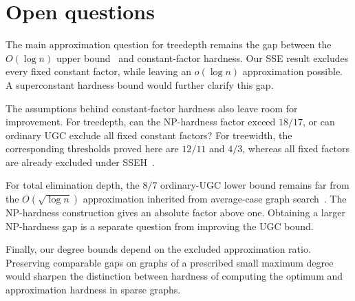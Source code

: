 \section{Open questions}
\label{sec:conclusion}

The main approximation question for treedepth remains the gap
between the $O(\log n)$ upper bound~\cite{Anand2026} and
constant-factor hardness. Our \textup{SSE} result excludes every fixed
constant factor, while leaving an $o(\log n)$ approximation
possible. A superconstant hardness bound would further clarify
this gap.

The assumptions behind constant-factor hardness also leave room
for improvement. For treedepth, can the \textup{NP}-hardness factor exceed
$18/17$, or can ordinary \textup{UGC} exclude all fixed constant factors?
For treewidth, the corresponding thresholds proved here are
$12/11$ and $4/3$, whereas all fixed factors are already excluded
under \textup{SSEH}~\cite{APW}.

For total elimination depth, the $8/7$ ordinary-\textup{UGC} lower bound
remains far from the $O(\sqrt{\log n})$ approximation inherited
from average-case graph search~\cite{Szyfelbein2025GraphSearch}.
The \textup{NP}-hardness construction gives an absolute factor above one.
Obtaining a larger \textup{NP}-hardness gap is a separate question from
improving the \textup{UGC} bound.

Finally, our degree bounds depend on the excluded approximation
ratio. Preserving comparable gaps on graphs of a prescribed small
maximum degree would sharpen the distinction between hardness of
computing the optimum and approximation hardness in sparse graphs.
